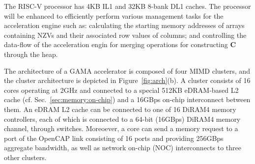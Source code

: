 The RISC-V processor has 4KB IL1 and 32KB 8-bank DL1 caches.
The processor will be enhanced to efficiently perform various management tasks for the acceleration engine such as:
calculating the starting memory addresses of arrays containing NZVs and their associated row values of columns; and
controlling the data-flow of the acceleration engin for merging operations for constructing \textbf{C} through the heap.
 



The architecture of a GAMA accelerator is composed of four MIMD clusters, and the cluster architecture is depicted in Figure~\ref{fig:arch}(b).
A cluster consists of 16 cores operating at 2GHz and connected to a special 512KB eDRAM-based L2 cache (cf. Sec.~\ref{sec:memory:on-chip}) and a 16GBps on-chip interconnect between them. 
An eDRAM L2 cache can be connected to one of 16 DiRAM4 memory controllers, each of which is connected to a 64-bit (16GBps) DiRAM4 memory channel, through switches.
Moreoever, a core can send a memory request to a port of the OpenCAP link consisting of 16 ports and providing 256GBps aggregate bandwidth, as well as network on-chip (NOC) interconnects to three other clusters.  


\begin{comment}
\noindent
\textbf{Coarse-Grained Reconfigurable Processing Engine:} 
To efficiently execute graph primitives, we aim to architect the CGR-Core with a coarse-grain reconfigurable (CGR) array of execution units. 
This architecture based on a spatial data-flow architecture can significantly reduce the overhead of instruction fetches and data transfers within an accelerator, as many operations for a complex graph primitive function can be executed by a single (macro) instruction and a few registerfile and/or cache accesses. 
Furthermore, for streaming graph analytics, it is very inefficient to apply computations and changes to individual vertices as they arrive. 
We propose the update buffer to allow CGR-Core to bulk commit messages bound for (or coming from) multiple vertices in a single phase.
\end{comment}



